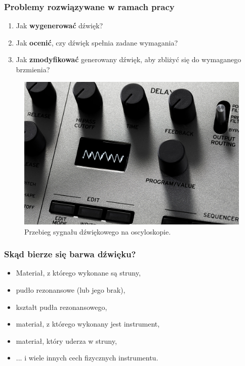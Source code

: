\documentclass[]{beamer}
\begin{document}
\begin{frame}
  \frametitle{Problemy rozwiązywane w ramach pracy}

  \begin{multicols}{2}

  \begin{enumerate}
    \item Jak \textbf{wygenerować} dźwięk?
    \item Jak \textbf{ocenić}, czy dźwięk spełnia zadane wymagania?
    \item Jak \textbf{zmodyfikować} generowany dźwięk, aby zbliżyć się do wymaganego brzmienia?
  \end{enumerate}

  \begin{figure}
    \centering
    \includegraphics[width=1.0\linewidth]{minilogue_oscillator.jpg}
    \caption{Przebieg sygnału dźwiękowego na oscyloskopie.}
  \end{figure}
  \end{multicols}

\end{frame}

\begin{frame}
  \frametitle{Skąd bierze się barwa dźwięku?}
  \begin{itemize}
    \item Materiał, z którego wykonane są struny,
    \item pudło rezonansowe (lub jego brak),
    \item kształt pudła rezonansowego,
    \item materiał, z którego wykonany jest instrument,
    \item materiał, który uderza w struny,
    \item ... i wiele innych cech fizycznych instrumentu.
  \end{itemize}
\end{frame}
\end{document}
